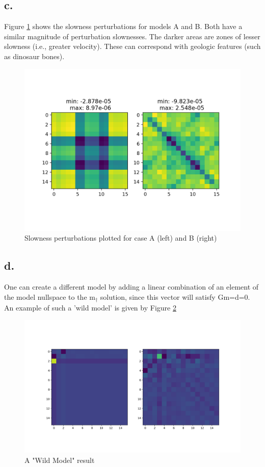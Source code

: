 \documentclass{article}
\begin{document}
\subsection*{c.}
Figure \ref{slowness imagel} shows the slowness perturbations for models A and B. Both have a similar magnitude of perturbation slownesses. The darker areas are zones of lesser slowness (i.e., greater velocity). These can correspond with geologic features (such as dinosaur bones). 

\begin{figure}[p]
    \centering
    \includegraphics[width=4.5in]{slowness_plots.png}
    \caption{Slowness perturbations plotted for case A (left) and B (right)}
    \label{slowness imagel}
\end{figure}


\newpage
\subsection*{d.}
One can create a different model by adding a linear combination of an element of the model nullspace to the m$_\dagger$ solution, since this vector will satisfy Gm=d=0. An example of such a 'wild model' is given by Figure \ref{Wild}
\begin{figure}[p]
    \centering
    \includegraphics[width=4.5in]{wildplot.png}
    \caption{A "Wild Model" result}
    \label{Wild}
\end{figure}
\end{document}
